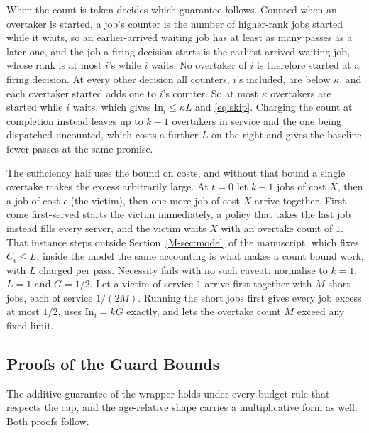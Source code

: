 \documentclass[mathematics,supfile,submit,moreauthors]{Definitions/mdpi}
\begin{document}
When the count is taken decides which guarantee follows. Counted when an overtaker is
started, a job's counter is the number of higher-rank jobs started while it waits, so an
earlier-arrived waiting job has at least as many passes as a later one, and the job a firing
decision starts is the earliest-arrived waiting job, whose rank is at most $i$'s while $i$
waits. No overtaker of $i$ is therefore started at a firing decision. At every other
decision all counters, $i$'s included, are below $\kappa$, and each overtaker started adds
one to $i$'s counter. So at most $\kappa$ overtakers are started while $i$ waits, which
gives $\mathrm{In}_i \le \kappa L$ and \eqref{eq:skip}. Charging the count at
completion instead leaves up to $k-1$ overtakers in service and the one being dispatched
uncounted, which costs a further $L$ on the right and gives the baseline fewer passes at
the same promise.

The sufficiency half uses the bound on costs, and without that bound a single
overtake makes the excess arbitrarily large. At $t = 0$ let $k-1$ jobs of cost $X$, then a
job of cost $\epsilon$ (the victim), then one more job of cost $X$ arrive together.
First-come first-served starts the victim immediately, a policy that takes the last job instead fills every server,
and the victim waits $X$ with an overtake count of $1$. That instance steps
outside Section~\ref*{M-sec:model} of the manuscript, which fixes $C_i \le L$; inside the model the
same accounting is what makes a count bound work, with $L$ charged per pass.
Necessity fails with no such caveat: normalise to $k=1$, $L=1$ and $G=1/2$.
Let a victim of service $1$ arrive first together with $M$ short jobs, each of
service $1/(2M)$. Running the short jobs first gives every job excess at most
$1/2$, uses $\mathrm{In}_i=kG$ exactly, and lets the overtake count $M$ exceed
any fixed limit.


\subsection{Proofs of the Guard Bounds}
\label{sec:supp_guardproofs}

The additive guarantee of the wrapper holds under every budget rule that respects the
cap, and the age-relative shape carries a multiplicative form as well. Both proofs
follow.
\end{document}

